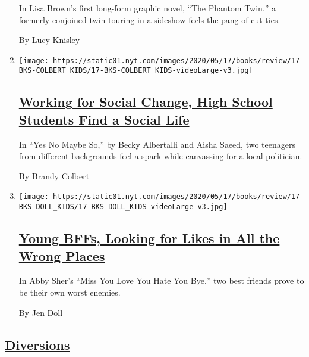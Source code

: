 \begin{enumerate}
  In Lisa Brown's first long-form graphic novel, ``The Phantom Twin,'' a
  formerly conjoined twin touring in a sideshow feels the pang of cut
  ties.

  By Lucy Knisley
\item
  \texttt{[image: https://static01.nyt.com/images/2020/05/17/books/review/17-BKS-COLBERT\_KIDS/17-BKS-COLBERT\_KIDS-videoLarge-v3.jpg]}

  \hypertarget{working-for-social-change-high-school-students-find-a-social-life}{%
  \subsection{\texorpdfstring{\href{/2020/05/08/books/review/yes-no-maybe-so-becky-albertalli-aisha-saeed.html}{Working
  for Social Change, High School Students Find a Social
  Life}}{Working for Social Change, High School Students Find a Social Life}}\label{working-for-social-change-high-school-students-find-a-social-life}}

  In ``Yes No Maybe So,'' by Becky Albertalli and Aisha Saeed, two
  teenagers from different backgrounds feel a spark while canvassing for
  a local politician.

  By Brandy Colbert
\item
  \texttt{[image: https://static01.nyt.com/images/2020/05/17/books/review/17-BKS-DOLL\_KIDS/17-BKS-DOLL\_KIDS-videoLarge-v3.jpg]}

  \hypertarget{young-bffs-looking-for-likes-in-all-the-wrong-places}{%
  \subsection{\texorpdfstring{\href{/2020/05/08/books/review/miss-you-love-you-hate-you-bye-abby-sher.html}{Young
  BFFs, Looking for Likes in All the Wrong
  Places}}{Young BFFs, Looking for Likes in All the Wrong Places}}\label{young-bffs-looking-for-likes-in-all-the-wrong-places}}

  In Abby Sher's ``Miss You Love You Hate You Bye,'' two best friends
  prove to be their own worst enemies.

  By Jen Doll
\end{enumerate}

\hypertarget{diversions}{%
\subsection{\texorpdfstring{\protect\hyperlink{}{Diversions}}{Diversions}}\label{diversions}}

